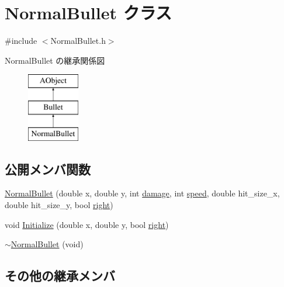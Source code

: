 \hypertarget{class_normal_bullet}{\section{Normal\+Bullet クラス}
\label{class_normal_bullet}
}


{\ttfamily \#include $<$Normal\+Bullet.\+h$>$}

Normal\+Bullet の継承関係図\begin{figure}[H]
\begin{center}
\leavevmode
\includegraphics[height=3.000000cm]{class_normal_bullet}
\end{center}
\end{figure}
\subsection*{公開メンバ関数}
\begin{DoxyCompactItemize}
\item 
\hyperlink{class_normal_bullet_add2bcc3b93849c896f64229fde79254f}{Normal\+Bullet} (double x, double y, int \hyperlink{class_bullet_a6e5b78574ec8fbff411b1319cf111799}{damage}, int \hyperlink{class_a_object_abb924b7e558a2f9d86f2db2bc2fb18a4}{speed}, double hit\+\_\+size\+\_\+x, double hit\+\_\+size\+\_\+y, bool \hyperlink{class_a_object_a7453abe76bbddf446aa5787231428a52}{right})
\item 
void \hyperlink{class_normal_bullet_a9b45cff025d4c522b290c8c7056fae74}{Initialize} (double x, double y, bool \hyperlink{class_a_object_a7453abe76bbddf446aa5787231428a52}{right})
\item 
\hyperlink{class_normal_bullet_a3f66cb167c1499518d07e3bcb38678b6}{$\sim$\+Normal\+Bullet} (void)
\end{DoxyCompactItemize}
\subsection*{その他の継承メンバ}


